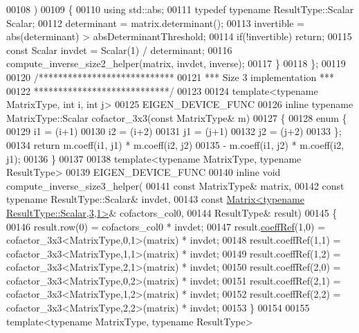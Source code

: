 \begin{DoxyCode}
00108   )
00109   \{
00110     \textcolor{keyword}{using} std::abs;
00111     \textcolor{keyword}{typedef} \textcolor{keyword}{typename} ResultType::Scalar Scalar;
00112     determinant = matrix.determinant();
00113     invertible = abs(determinant) > absDeterminantThreshold;
00114     \textcolor{keywordflow}{if}(!invertible) \textcolor{keywordflow}{return};
00115     \textcolor{keyword}{const} Scalar invdet = Scalar(1) / determinant;
00116     compute\_inverse\_size2\_helper(matrix, invdet, inverse);
00117   \}
00118 \};
00119 
00120 \textcolor{comment}{/****************************}
00121 \textcolor{comment}{*** Size 3 implementation ***}
00122 \textcolor{comment}{****************************/}
00123 
00124 \textcolor{keyword}{template}<\textcolor{keyword}{typename} MatrixType, \textcolor{keywordtype}{int} i, \textcolor{keywordtype}{int} j>
00125 EIGEN\_DEVICE\_FUNC 
00126 \textcolor{keyword}{inline} \textcolor{keyword}{typename} MatrixType::Scalar cofactor\_3x3(\textcolor{keyword}{const} MatrixType& m)
00127 \{
00128   \textcolor{keyword}{enum} \{
00129     i1 = (i+1) %
00130     i2 = (i+2) %
00131     j1 = (j+1) %
00132     j2 = (j+2) %
00133   \};
00134   \textcolor{keywordflow}{return} m.coeff(i1, j1) * m.coeff(i2, j2)
00135        - m.coeff(i1, j2) * m.coeff(i2, j1);
00136 \}
00137 
00138 \textcolor{keyword}{template}<\textcolor{keyword}{typename} MatrixType, \textcolor{keyword}{typename} ResultType>
00139 EIGEN\_DEVICE\_FUNC
00140 \textcolor{keyword}{inline} \textcolor{keywordtype}{void} compute\_inverse\_size3\_helper(
00141     \textcolor{keyword}{const} MatrixType& matrix,
00142     \textcolor{keyword}{const} \textcolor{keyword}{typename} ResultType::Scalar& invdet,
00143     \textcolor{keyword}{const} \hyperlink{group___core___module_class_eigen_1_1_matrix}{Matrix<typename ResultType::Scalar,3,1>}& cofactors\_col0,
00144     ResultType& result)
00145 \{
00146   result.row(0) = cofactors\_col0 * invdet;
00147   result.\hyperlink{class_eigen_1_1_plain_object_base_a25626a55b26a4323565f79d1b7c48ea8}{coeffRef}(1,0) =  cofactor\_3x3<MatrixType,0,1>(matrix) * invdet;
00148   result.coeffRef(1,1) =  cofactor\_3x3<MatrixType,1,1>(matrix) * invdet;
00149   result.coeffRef(1,2) =  cofactor\_3x3<MatrixType,2,1>(matrix) * invdet;
00150   result.coeffRef(2,0) =  cofactor\_3x3<MatrixType,0,2>(matrix) * invdet;
00151   result.coeffRef(2,1) =  cofactor\_3x3<MatrixType,1,2>(matrix) * invdet;
00152   result.coeffRef(2,2) =  cofactor\_3x3<MatrixType,2,2>(matrix) * invdet;
00153 \}
00154 
00155 \textcolor{keyword}{template}<\textcolor{keyword}{typename} MatrixType, \textcolor{keyword}{typename} ResultType>

\end{DoxyCode}
